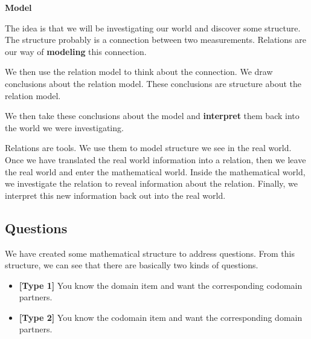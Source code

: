\documentclass{ximera}
\begin{document}
\begin{idea} \textbf{\textcolor{red!80!black}{Model}} 


The idea is that we will be investigating our world and discover some structure.  The structure probably is a connection between two measurements. Relations are our way of \textbf{\textcolor{red!80!black}{modeling}} this connection.

We then use the relation model to think about the connection.  We draw conclusions about the relation model. These conclusions are structure about the relation model.

We then take these conclusions about the model and \textbf{\textcolor{purple!85!blue}{interpret}} them back into the world we were investigating.

\end{idea}

Relations are tools.  We use them to model structure we see in the real world. Once we have translated the real world information into a relation, then we leave the real world and enter the mathematical world. Inside the mathematical world, we investigate the relation to reveal information about the relation.  Finally, we interpret this new information back out into the real world. \\








\subsection*{Questions}


We have created some mathematical structure to address questions. From this structure, we can see that there are basically two kinds of questions.

\begin{itemize}
\item \textbf{\textcolor{blue!55!black}{[Type 1]}} You know the domain item and want the corresponding codomain partners.
\item \textbf{\textcolor{blue!55!black}{[Type 2]}} You know the codomain item and want the corresponding domain partners.
\end{itemize}
\end{document}
